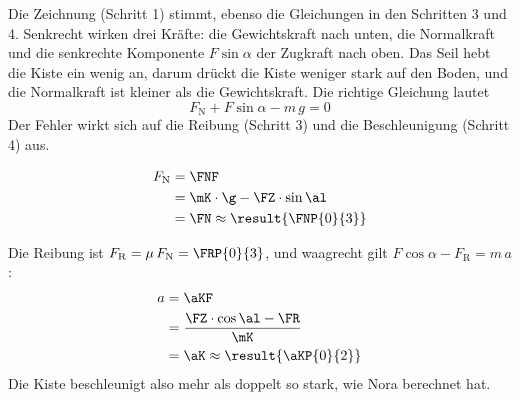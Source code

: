 \begin{abcliste}
\abc
Die Zeichnung (Schritt 1) stimmt, ebenso die Gleichungen in den Schritten 3 und 4.  Senkrecht wirken drei Kräfte: die Gewichtskraft nach unten, die Normalkraft und die senkrechte Komponente $F\sin\alpha$ der Zugkraft nach oben. Das Seil hebt die Kiste ein wenig an, darum drückt die Kiste weniger stark auf den Boden, und die Normalkraft ist kleiner als die Gewichtskraft. Die richtige Gleichung lautet
\[
 F_\mathrm{N} + F\sin\alpha - m\,g = 0
\]
Der Fehler wirkt sich auf die Reibung (Schritt 3) und die Beschleunigung (Schritt 4) aus.

\abc
\begin{align}
 F_\mathrm{N} &= \FNF \\
   &= \mK\cdot\g-\FZ\cdot\sin\al \\
   &= \FN \approx \result{\FNP{0}{3}}
\end{align}

\abc
Die Reibung ist $F_\mathrm{R} = \mu\,F_\mathrm{N} = \FRP{0}{3}$, und waagrecht gilt $F\cos\alpha - F_\mathrm{R} = m\,a$:
\begin{align}
 a &= \aKF \\
   &= \frac{\FZ\cdot\cos\al-\FR}{\mK} \\
   &= \aK \approx \result{\aKP{0}{2}}
\end{align}
Die Kiste beschleunigt also mehr als doppelt so stark, wie Nora berechnet hat.
\end{abcliste}
